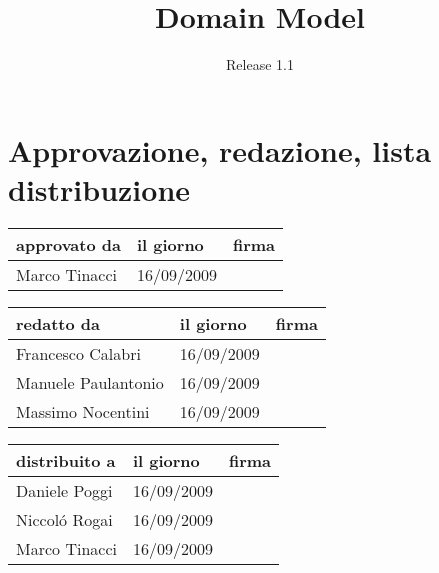 \documentclass[a4paper, 12pt]{article}
\title{Domain Model}
\author{Release 1.1}
\date{\today \\Firenze \\\begin{figure}[h] \centering
\texttt{[image: ../../../images/logokiwi.png]} 
\end{figure}
}
\begin{document}
\maketitle

\newpage

\section*{Approvazione, redazione, lista distribuzione}
\begin{table}[h!]
  \begin{center}
    \begin{tabular}{| l | l | p{60mm} |}
    \hline
    \textbf{approvato da} & \textbf{il giorno} & \textbf{firma} \\
	\hline    
	Marco Tinacci & 16/09/2009 &  \\
    \hline
    \end{tabular}
  \end{center}
\end{table}

\begin{table}[h!]
  \begin{center}
    \begin{tabular}{| l | l | p{60mm} |}
    \hline
    \textbf{redatto da} & \textbf{il giorno} & \textbf{firma} \\
    \hline
    Francesco Calabri & 16/09/2009 &  \\
    \hline
	Manuele Paulantonio & 16/09/2009 &  \\
    \hline    
	Massimo Nocentini & 16/09/2009 &  \\
    \hline
    \end{tabular}
  \end{center}
\end{table}

\begin{table}[h!]
  \begin{center}
    \begin{tabular}{| l | l | p{60mm} |}
    \hline
    \textbf{distribuito a} & \textbf{il giorno} & \textbf{firma} \\
	\hline    
	Daniele Poggi & 16/09/2009 &  \\
    \hline
	Niccol\'o Rogai & 16/09/2009 &  \\
    \hline
	Marco Tinacci & 16/09/2009 &  \\
    \hline
    \end{tabular}
  \end{center}
\end{table}
\end{document}
